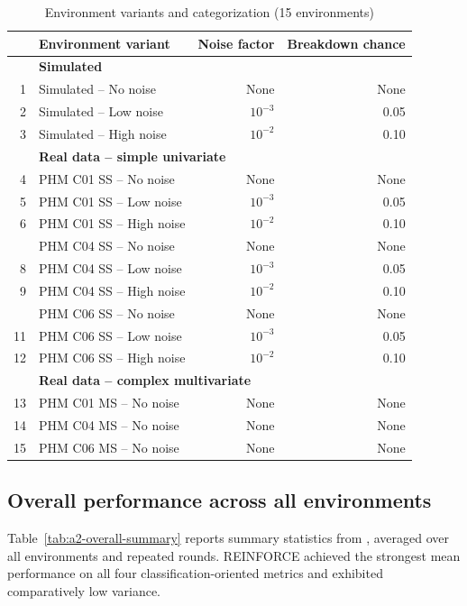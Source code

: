 \documentclass[12pt,oneside]{book}
\renewcommand{\arraystretch}{1.5}
\begin{document}
\begin{table}[htbp]
	\centering
	\caption{Environment variants and categorization (15 environments)}
	\label{tab:a2-env-list}
	{\renewcommand{\arraystretch}{1.05}
	\begin{tabular}{@{}r l rr@{}}
		\arrayrulecolor{black!40}\toprule
		& Environment variant & Noise factor & Breakdown chance \\ \midrule
		& \multicolumn{3}{l}{\textbf{Simulated}}\\
		1 & Simulated -- No noise & None & None \\
		2 & Simulated -- Low noise & $10^{-3}$ & 0.05 \\
		3 & Simulated -- High noise & $10^{-2}$ & 0.10 \\ \midrule
		\rule{0pt}{1.2\normalbaselineskip}
		& \multicolumn{3}{l}{\textbf{Real data -- simple univariate}} \\
		4 & PHM C01 SS -- No noise & None & None \\
		5 & PHM C01 SS -- Low noise & $10^{-3}$ & 0.05 \\
		6 & PHM C01 SS -- High noise & $10^{-2}$ & 0.10 \\ \hdashline
		7 & PHM C04 SS -- No noise & None & None \\
		8 & PHM C04 SS -- Low noise & $10^{-3}$ & 0.05 \\
		9 & PHM C04 SS -- High noise & $10^{-2}$ & 0.10 \\ \hdashline
		10 & PHM C06 SS -- No noise & None & None \\
		11 & PHM C06 SS -- Low noise & $10^{-3}$ & 0.05 \\
		12 & PHM C06 SS -- High noise & $10^{-2}$ & 0.10 \\ \midrule
		\rule{0pt}{1.2\normalbaselineskip}
		& \multicolumn{3}{l}{\textbf{Real data -- complex multivariate}}\\
		13 & PHM C01 MS -- No noise & None & None \\
		14 & PHM C04 MS -- No noise & None & None \\
		15 & PHM C06 MS -- No noise & None & None \\
		\bottomrule
	\end{tabular}}
\end{table}

\subsection{Overall performance across all environments}
Table~\ref{tab:a2-overall-summary} reports summary statistics from \cite{Siraskar2025}, averaged over all environments and repeated rounds. \textsc{REINFORCE} achieved the strongest mean performance on all four classification-oriented metrics and exhibited comparatively low variance.
\end{document}
